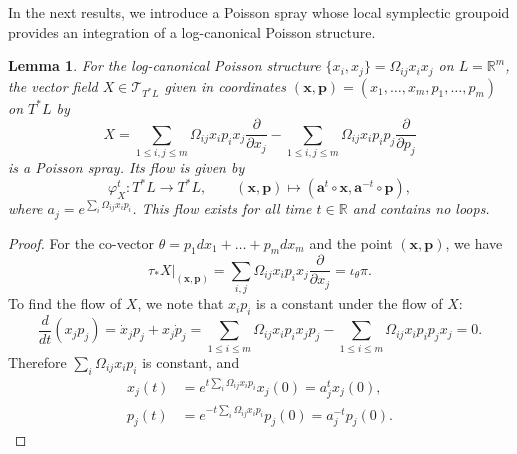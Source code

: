 \documentclass{amsart}
\newtheorem{lemma}[theorem]{Lemma}
\numberwithin{equation}{section}
\newcommand{\bfa}{{\boldsymbol{a}}}
\newcommand{\bfp}{{\boldsymbol{p}}}
\newcommand{\bfx}{{\boldsymbol{x}}}
\newcommand{\cT}{\mathcal{T}}
\newcommand{\RR}{\mathbb{R}}
\begin{document}
In the next results, we introduce a Poisson spray whose local symplectic groupoid provides an integration of a log-canonical Poisson structure.
\begin{lemma} \label{lemma:PoisSp}
  For the log-canonical Poisson structure $\{x_i, x_j\} = \Omega_{ij} x_i x_j$ on $L = \RR^m$, the vector field $X \in \cT_{T^*L}$ given in coordinates $(\bfx, \bfp) = (x_1, \ldots, x_m, p_1, \ldots, p_m)$ on $T^*L$ by
  \begin{equation} 
    \label{eq: PoisSp}
    X = \sum_{1 \leq i,j \leq m}\Omega_{ij}x_i p_i x_j\frac{\partial}{\partial x_j} - \sum_{1 \leq i,j \leq m}\Omega_{ij}x_ip_i p_j\frac{\partial}{\partial p_j}
  \end{equation}
  is a Poisson spray.
  Its flow is given by
  \[\varphi_X^t: T^*L \to T^*L, \qquad (\bfx, \bfp) \mapsto (\bfa^t \circ \bfx, \bfa^{-t} \circ \bfp),\]
  where $a_j = e^{\sum_i \Omega_{ij} x_ip_i}$.
  This flow exists for all time $t \in \RR$ and contains no loops.
\end{lemma}

\begin{proof}
  For the co-vector $\theta = p_1 dx_1 + \ldots + p_m dx_m$ and the point $(\bfx, \bfp)$, we have
  \[\tau_* X|_{(\bfx,\bfp)} = \sum_{i, j}\Omega_{ij} x_i p_i x_j \frac{\partial}{\partial x_j} = \iota_\theta \pi.\]
  To find the flow of $X$, we note that $x_i p_i$ is a constant under the flow of $X$:
  \[\frac{d}{dt}(x_j p_j) = \dot{x}_j p_j + x_j \dot{p}_j = \sum_{1 \leq i \leq m}\Omega_{ij}x_i p_i x_j p_j - \sum_{1 \leq i \leq m}\Omega_{ij}x_ip_i p_j x_j = 0.\]
  Therefore $\sum_{i}\Omega_{ij}x_i p_i$ is constant, and
  \begin{align*}
    x_j(t) & = e^{t \sum_i \Omega_{ij} x_ip_i} x_j(0) = a_j^t x_j(0), \\
    p_j(t) & = e^{-t \sum_i \Omega_{ij} x_ip_i} p_j(0) = a_j^{-t} p_j(0).
  \end{align*}
\end{proof}
\end{document}
